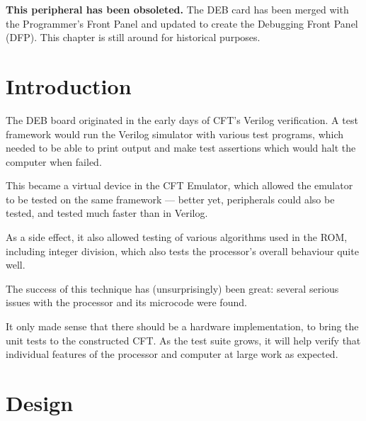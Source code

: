 
\label{chap:deb}



\begin{obsoleted}
\textbf{This peripheral has been obsoleted.} The DEB card has been merged
with the Programmer's Front Panel and updated to create the Debugging
Front Panel (DFP). This chapter is still around for historical purposes.
\end{obsoleted}

\section{Introduction}

The \gls{DEB} board originated in the early days of CFT's
\gls{Verilog} verification. A test framework would run the Verilog
simulator with various test programs, which needed to be able to print
output and make test assertions which would halt the computer when
failed.

This became a virtual device in the CFT Emulator, which allowed the
emulator to be tested on the same framework — better yet, peripherals
could also be tested, and tested much faster than in Verilog.

As a side effect, it also allowed testing of various algorithms used
in the ROM, including integer division, which also tests the
processor's overall behaviour quite well.

The success of this technique has (unsurprisingly) been great: several
serious issues with the processor and its microcode were found.

It only made sense that there should be a hardware implementation, to
bring the unit tests to the constructed CFT. As the test suite grows,
it will help verify that individual features of the processor and
computer at large work as expected.

\section{Design}

